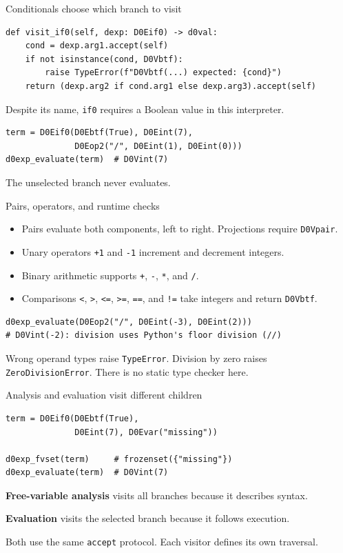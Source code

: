 \documentclass[aspectratio=169,11pt]{beamer}
\newcommand{\code}[1]{\texttt{#1}}
\begin{document}
\begin{frame}[fragile]{Conditionals choose which branch to visit}
\begin{lstlisting}
def visit_if0(self, dexp: D0Eif0) -> d0val:
    cond = dexp.arg1.accept(self)
    if not isinstance(cond, D0Vbtf):
        raise TypeError(f"D0Vbtf(...) expected: {cond}")
    return (dexp.arg2 if cond.arg1 else dexp.arg3).accept(self)
\end{lstlisting}
Despite its name, \code{if0} requires a Boolean value in this interpreter.
\begin{lstlisting}
term = D0Eif0(D0Ebtf(True), D0Eint(7),
              D0Eop2("/", D0Eint(1), D0Eint(0)))
d0exp_evaluate(term)  # D0Vint(7)
\end{lstlisting}
The unselected branch never evaluates.
\end{frame}

\begin{frame}[fragile]{Pairs, operators, and runtime checks}
\begin{itemize}
\item Pairs evaluate both components, left to right. Projections require \code{D0Vpair}.
\item Unary operators \code{+1} and \code{-1} increment and decrement integers.
\item Binary arithmetic supports \code{+}, \code{-}, \code{*}, and \code{/}.
\item Comparisons \code{<}, \code{>}, \code{<=}, \code{>=}, \code{==}, and \code{!=} take integers and return \code{D0Vbtf}.
\end{itemize}
\begin{lstlisting}
d0exp_evaluate(D0Eop2("/", D0Eint(-3), D0Eint(2)))
# D0Vint(-2): division uses Python's floor division (//)
\end{lstlisting}
Wrong operand types raise \code{TypeError}. Division by zero raises
\code{ZeroDivisionError}. There is no static type checker here.
\end{frame}

\begin{frame}[fragile]{Analysis and evaluation visit different children}
\begin{lstlisting}
term = D0Eif0(D0Ebtf(True),
              D0Eint(7), D0Evar("missing"))

d0exp_fvset(term)     # frozenset({"missing"})
d0exp_evaluate(term)  # D0Vint(7)
\end{lstlisting}
\textbf{Free-variable analysis} visits all branches because it describes syntax.
\medskip

\textbf{Evaluation} visits the selected branch because it follows execution.
\medskip

Both use the same \code{accept} protocol. Each visitor defines its own traversal.
\end{frame}
\end{document}
